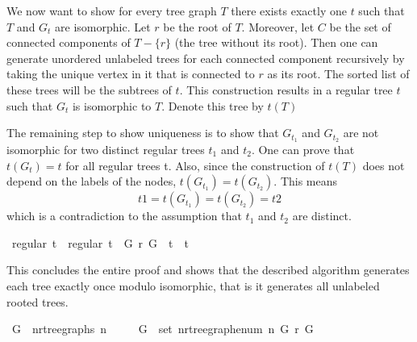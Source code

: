 We now want to show for every tree graph $T$ there exists exactly one $t$ such that $T$ and $G_t$ are isomorphic.
Let $r$ be the root of $T$.
Moreover, let $C$ be the set of connected components of $T - \{r\}$ (the tree without its root). 
Then one can generate unordered unlabeled trees for each connected component recursively by taking the unique vertex in it that is connected to $r$ as its root.
The sorted list of these trees will be the subtrees of $t$.
This construction results in a regular tree $t$ such that $G_t$ is isomorphic to $T$.
Denote this tree by $t(T)$

The remaining step to show uniqueness is to show that $G_{t_1}$ and $G_{t_2}$ are not isomorphic for two distinct regular trees $t_1$ and $t_2$.
One can prove that $t(G_t) = t$ for all regular trees t.
Also, since the construction of $t(T)$ does not depend on the labels of the nodes, $t(G_{t_1}) = t(G_{t_2})$.
This means
\[
    t1 = t(G_{t_1}) = t(G_{t_2}) = t2
\]
which is a contradiction to the assumption that $t_1$ and $t_2$ are distinct.
\begin{isabellebox}
    \isamarkupfalse%
    {\kern0pt}\ {\isachardoublequoteopen}regular\ t{}\ {\isasymLongrightarrow}\ regular\ t{}\ {\isasymLongrightarrow}\ G\ {\isasymsimeq}\isactrlsub r\ G\ {\isasymLongrightarrow}\ t{}\ {\isacharequal}{\kern0pt}\ t{}{\isachardoublequoteclose}
\end{isabellebox}

This concludes the entire proof and shows that the described algorithm generates each tree exactly once modulo isomorphic, that is it generates all unlabeled rooted trees.

\begin{isabellebox}
    \isamarkupfalse%
    \ {\isachardoublequoteopen}G\ {\isasymin}\ n{\isacharunderscore}{\kern0pt}rtree{\isacharunderscore}{\kern0pt}graphs\ n\isanewline
    \ \ \ \ {\isasymLongrightarrow}\ {\isasymexists}{\isacharbang}{\kern0pt}G{\isacharprime}{\kern0pt}\ {\isasymin}\ set\ {\isacharparenleft}{\kern0pt}n{\isacharunderscore}{\kern0pt}rtree{\isacharunderscore}{\kern0pt}graph{\isacharunderscore}{\kern0pt}enum\ n{\isacharparenright}{\kern0pt}{\isachardot}{\kern0pt}\ G{\isacharprime}{\kern0pt}\ {\isasymsimeq}\isactrlsub r\ G{\isachardoublequoteclose}
\end{isabellebox}
